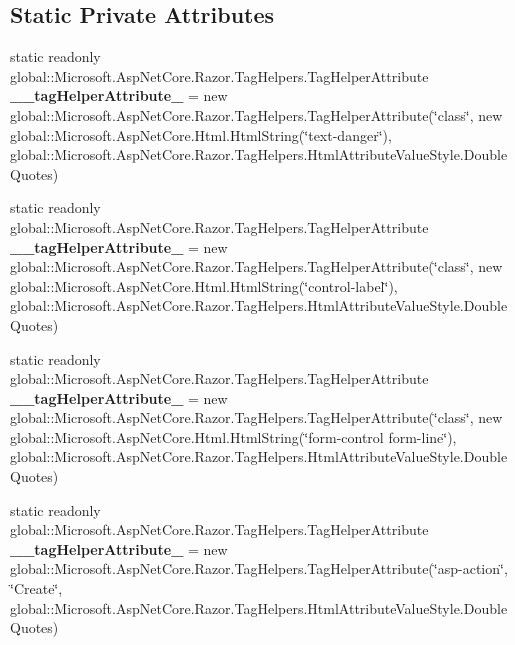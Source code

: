 \subsection*{Static Private Attributes}
\begin{DoxyCompactItemize}
\item 
\mbox{\label{class_asp_net_core_1_1_views___volunteers___create_a5f2e1496bec3719d32cebfb337ee26ac}} 
static readonly global\+::\+Microsoft.\+Asp\+Net\+Core.\+Razor.\+Tag\+Helpers.\+Tag\+Helper\+Attribute {\bfseries \+\_\+\+\_\+tag\+Helper\+Attribute\+\_} = new global\+::\+Microsoft.\+Asp\+Net\+Core.\+Razor.\+Tag\+Helpers.\+Tag\+Helper\+Attribute(\char`\"{}class\char`\"{}, new global\+::\+Microsoft.\+Asp\+Net\+Core.\+Html.\+Html\+String(\char`\"{}text-\/danger\char`\"{}), global\+::\+Microsoft.\+Asp\+Net\+Core.\+Razor.\+Tag\+Helpers.\+Html\+Attribute\+Value\+Style.\+Double\+Quotes)
\item 
\mbox{\label{class_asp_net_core_1_1_views___volunteers___create_aec7bb00720aee0d920ae84aba0c11213}} 
static readonly global\+::\+Microsoft.\+Asp\+Net\+Core.\+Razor.\+Tag\+Helpers.\+Tag\+Helper\+Attribute {\bfseries \+\_\+\+\_\+tag\+Helper\+Attribute\+\_} = new global\+::\+Microsoft.\+Asp\+Net\+Core.\+Razor.\+Tag\+Helpers.\+Tag\+Helper\+Attribute(\char`\"{}class\char`\"{}, new global\+::\+Microsoft.\+Asp\+Net\+Core.\+Html.\+Html\+String(\char`\"{}control-\/label\char`\"{}), global\+::\+Microsoft.\+Asp\+Net\+Core.\+Razor.\+Tag\+Helpers.\+Html\+Attribute\+Value\+Style.\+Double\+Quotes)
\item 
\mbox{\label{class_asp_net_core_1_1_views___volunteers___create_a059d9e6f0beacc56ac88606f2967a06d}} 
static readonly global\+::\+Microsoft.\+Asp\+Net\+Core.\+Razor.\+Tag\+Helpers.\+Tag\+Helper\+Attribute {\bfseries \+\_\+\+\_\+tag\+Helper\+Attribute\+\_} = new global\+::\+Microsoft.\+Asp\+Net\+Core.\+Razor.\+Tag\+Helpers.\+Tag\+Helper\+Attribute(\char`\"{}class\char`\"{}, new global\+::\+Microsoft.\+Asp\+Net\+Core.\+Html.\+Html\+String(\char`\"{}form-\/control form-\/line\char`\"{}), global\+::\+Microsoft.\+Asp\+Net\+Core.\+Razor.\+Tag\+Helpers.\+Html\+Attribute\+Value\+Style.\+Double\+Quotes)
\item 
\mbox{\label{class_asp_net_core_1_1_views___volunteers___create_afeb3377efd1ccc767d7a36db6eed5378}} 
static readonly global\+::\+Microsoft.\+Asp\+Net\+Core.\+Razor.\+Tag\+Helpers.\+Tag\+Helper\+Attribute {\bfseries \+\_\+\+\_\+tag\+Helper\+Attribute\+\_} = new global\+::\+Microsoft.\+Asp\+Net\+Core.\+Razor.\+Tag\+Helpers.\+Tag\+Helper\+Attribute(\char`\"{}asp-\/action\char`\"{}, \char`\"{}Create\char`\"{}, global\+::\+Microsoft.\+Asp\+Net\+Core.\+Razor.\+Tag\+Helpers.\+Html\+Attribute\+Value\+Style.\+Double\+Quotes)
\end{DoxyCompactItemize}


